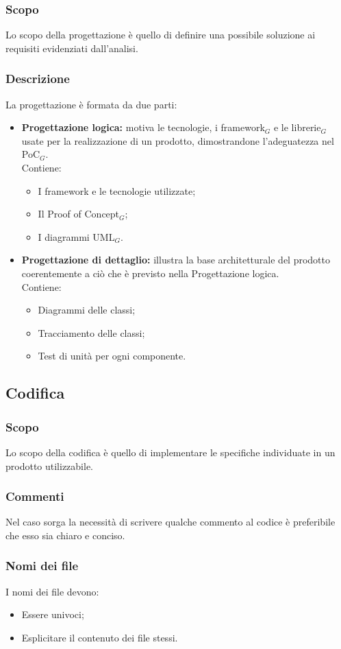   \subsubsection{Scopo}
  Lo scopo della progettazione è quello di definire una possibile soluzione ai requisiti evidenziati dall'analisi.
  \subsubsection{Descrizione}
  La progettazione è formata da due parti:
  \begin{itemize}
    \item \textbf{Progettazione logica:} motiva le tecnologie, i framework$_G$ e le librerie$_G$ usate per la realizzazione di un prodotto, dimostrandone l'adeguatezza nel PoC$_G$.
    \\Contiene:
    \begin{itemize}
      \item I framework e le tecnologie utilizzate;
      \item Il Proof of Concept$_G$;
      \item I diagrammi UML$_G$.
    \end{itemize}
    \item \textbf{Progettazione di dettaglio:} illustra la base architetturale del prodotto coerentemente a ciò che è previsto nella Progettazione logica.
    \\Contiene:
    \begin{itemize}
      \item Diagrammi delle classi;
      \item Tracciamento delle classi;
      \item Test di unità per ogni componente.
    \end{itemize}
  \end{itemize}

  \subsection{Codifica}
  \subsubsection{Scopo}
  Lo scopo della codifica è quello di implementare le specifiche individuate in un prodotto utilizzabile.
  \subsubsection{Commenti}
  Nel caso sorga la necessità di scrivere qualche commento al codice è preferibile che esso sia chiaro e conciso.
  \subsubsection{Nomi dei file}
  I nomi dei file devono:
  \begin{itemize}
    \item Essere univoci;
    \item Esplicitare il contenuto dei file stessi.
  \end{itemize}
